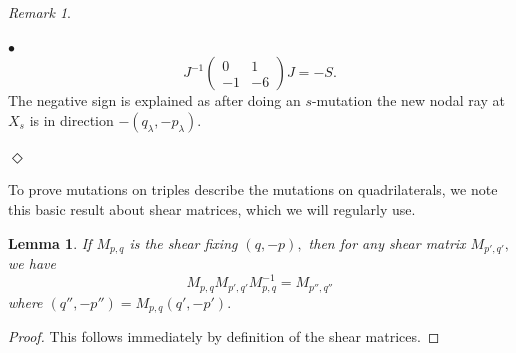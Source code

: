 \documentclass[11pt, reqno]{amsart}
\newtheorem{lemma}[thm]{Lemma}
\theoremstyle{remark}
\numberwithin{equation}{subsection}
\numberwithin{figure}{section}
\theoremstyle{customremark}
\newtheorem{rmk_no_diamond}[thm]{Remark}
\newenvironment{rmk}{\begin{rmk_no_diamond} } {\hfill$\er$ \end{rmk_no_diamond}}
\newenvironment{itemlist}
   { \begin{list} {$\bullet$}
         { \setlength{\topsep}{.5ex}  \setlength{\itemsep}{.5ex} \setlength{\leftmargin}{2.5ex} } }
   { \end{list} }
\newcommand{\la}{{\lambda}}
\newcommand{\er}{{\Diamond}}
\begin{document}
\begin{rmk}
\begin{itemlist}
    \[ J^{-1}\begin{pmatrix}
        0 & 1 \\ -1 & -6
    \end{pmatrix}J=-S.\] The negative sign is explained as after doing an $s$-mutation the new nodal ray at $X_s$ is in direction $-(q_\la,-p_\la)$. 
\end{itemlist}


    
\end{rmk}

To prove mutations on triples describe the mutations on quadrilaterals, we note this basic result about shear matrices, which we will regularly use. 
\begin{lemma} \label{lem:conjugation}
    If $M_{p,q}$ is the shear fixing $(q,-p),$ then for any shear matrix $M_{p',q'},$ we have
   \[ M_{p,q}M_{p',q'}M^{-1}_{p,q}=M_{p'',q''}\]
   where $(q'',-p'')=M_{p,q}(q',-p').$
    \end{lemma}
\begin{proof}
    This follows immediately by definition of the shear matrices. 
\end{proof}
\end{document}

